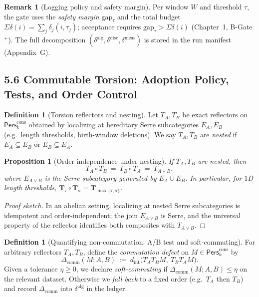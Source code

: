 \documentclass[11pt]{article}
\DeclareRobustCommand{\hyp}{\nobreakdash-}
\newcommand{\Pers}{\mathsf{Pers}}
\numberwithin{equation}{section}
\newtheorem{proposition}[theorem]{Proposition}
\theoremstyle{definition}
\newtheorem{definition}[theorem]{Definition}
\newtheorem{remark}[theorem]{Remark}
\begin{document}
\begin{remark}[Logging policy and safety margin]
Per window $W$ and threshold $\tau$, the gate uses the \emph{safety margin} $\mathrm{gap}_\tau$ and the total budget $\Sigma\delta(i)=\sum_j \delta_j(i,\tau_j)$; acceptance requires $\mathrm{gap}_\tau>\Sigma\delta(i)$ (Chapter~1, B\hyp Gate$^+$). The full decomposition $(\delta^{\mathrm{alg}},\delta^{\mathrm{disc}},\delta^{\mathrm{meas}})$ is stored in the run manifest (Appendix~G).
\end{remark}

\subsection*{5.6 Commutable Torsion: Adoption Policy, Tests, and Order Control}

\begin{definition}[Torsion reflectors and nesting]\label{def:torsion-reflectors}
Let $T_A,T_B$ be exact reflectors on $\mathsf{Pers}^{\mathrm{cons}}_k$ obtained by localizing at hereditary Serre subcategories $E_A,E_B$ (e.g.\ length thresholds, birth\hyp window deletions). We say $T_A,T_B$ are \emph{nested} if $E_A\subseteq E_B$ or $E_B\subseteq E_A$.
\end{definition}

\begin{proposition}[Order independence under nesting]\label{prop:nested-commute}
If $T_A,T_B$ are nested, then
\[
T_A\circ T_B\ =\ T_B\circ T_A\ =\ T_{A\vee B},
\]
where $E_{A\vee B}$ is the Serre subcategory generated by $E_A\cup E_B$. In particular, for $1$D length thresholds, $\mathbf{T}_\tau\circ \mathbf{T}_\sigma=\mathbf{T}_{\max\{\tau,\sigma\}}$.
\end{proposition}

\begin{proof}[Proof sketch]
In an abelian setting, localizing at nested Serre subcategories is idempotent and order\hyp independent; the join $E_{A\vee B}$ is Serre, and the universal property of the reflector identifies both composites with $T_{A\vee B}$.
\end{proof}

\begin{definition}[Quantifying non\hyp commutation: A/B test and soft\hyp commuting]\label{def:soft-commute}
For arbitrary reflectors $T_A,T_B$, define the \emph{commutation defect} on $M\in\Pers^{\mathrm{cons}}_k$ by
\[
\Delta_{\mathrm{comm}}(M;A,B)\ :=\ d_{\mathrm{int}}\!\big(T_A T_B M,\ T_B T_A M\big).
\]
Given a tolerance $\eta\ge 0$, we declare \emph{soft\hyp commuting} if $\Delta_{\mathrm{comm}}(M;A,B)\le \eta$ on the relevant dataset. Otherwise we \emph{fall back} to a fixed order (e.g.\ $T_A$ then $T_B$) and record $\Delta_{\mathrm{comm}}$ into $\delta^{\mathrm{alg}}$ in the ledger.
\end{definition}
\end{document}
